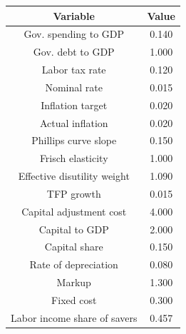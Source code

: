 \begin{table}[!ht]
\setlength\tabcolsep{0.425em}
\setlength\aboverulesep{0pt}
\setlength\belowrulesep{0.2em}
\centering
\begin{threeparttable}
\begin{tabular}{cc}
\toprule[0.1em]
Variable & Value \\[0.2em]
\midrule[0.075em]
Gov. spending to GDP & 0.140 \\[0.2em]
Gov. debt to GDP & 1.000 \\[0.2em]
Labor tax rate & 0.120 \\[0.2em]
Nominal rate & 0.015 \\[0.2em]
Inflation target & 0.020 \\[0.2em]
Actual inflation & 0.020 \\[0.2em]
Phillips curve slope & 0.150 \\[0.2em]
Frisch elasticity & 1.000 \\[0.2em]
Effective disutility weight & 1.090 \\[0.2em]
TFP growth & 0.015 \\[0.2em]
Capital adjustment cost & 4.000 \\[0.2em]
Capital to GDP & 2.000 \\[0.2em]
Capital share & 0.150 \\[0.2em]
Rate of depreciation & 0.080 \\[0.2em]
Markup & 1.300 \\[0.2em]
Fixed cost & 0.300 \\[0.2em]
Labor income share of savers & 0.457 \\[0.2em]
\bottomrule[0.1em]
\end{tabular}
\end{threeparttable}
\end{table}

